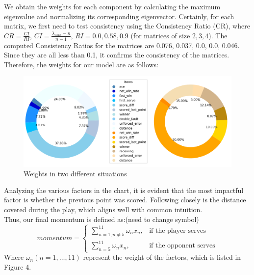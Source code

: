 \documentclass[12pt, a4paper, oneside]{article}
\theoremstyle{break}
\begin{document}


We obtain the weights for each component by calculating the maximum eigenvalue and normalizing its corresponding eigenvector. Certainly, for each matrix, we first need to test consistency using the Consistency Ratio (CR), where \(CR=\frac{CI}{RI}\), \(CI=\frac{\lambda_{max}-n}{n-1}\), \(RI=0.0, 0.58, 0.9\) (for matrices of size \(2, 3, 4\)). The computed Consistency Ratios for the matrices are 0.076, 0.037, 0.0, 0.0, 0.046. Since they are all less than 0.1, it confirms the consistency of the matrices.\\

\indent Therefore, the weights for our model are as follows:


\begin{figure}[H]
    \centering
    \includegraphics[scale=0.65]{imgs/7.png}
    \caption{Weights in two different situations}
\end{figure}


Analyzing the various factors in the chart, it is evident that the most impactful factor is whether the previous point was scored. Following closely is the distance covered during the play, which aligns well with common intuition.\\


Thus, our final momentum is defined as:(need to change symbol)
$$momentum=\begin{cases}
    \sum\limits_{n=1,n\neq 5}^{11}\omega_n x_n, & \text{if the player serves}  \\
    \sum\limits_{n=5}^{11}\omega_n x_n, & \text{if the opponent serves}
\end{cases}$$
Where $\omega_n(n=1,\dots,11)$ represent the weight of the factors, which is listed in Figure 4.\\
\end{document}
